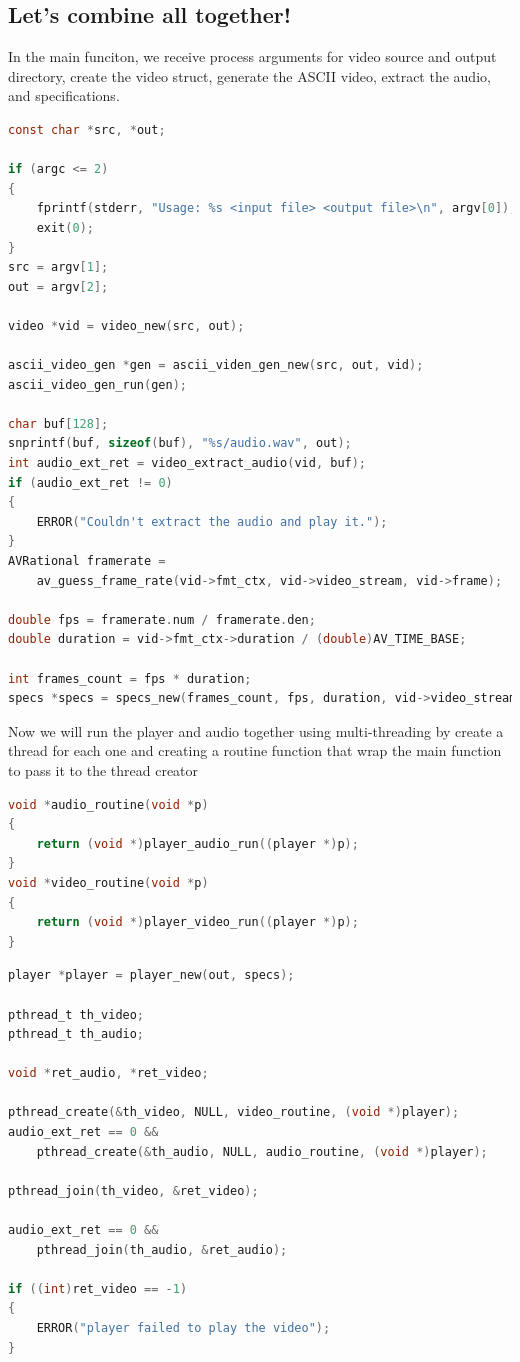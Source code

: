 \documentclass[a4paper,12pt]{article}
\begin{document}
\subsection{Let's combine all together!}
In the main funciton, we receive process arguments for video source and output directory, create the video struct, generate the ASCII video, extract the audio, and specifications.

\begin{lstlisting}[language=c]
 const char *src, *out;

if (argc <= 2)
{
    fprintf(stderr, "Usage: %s <input file> <output file>\n", argv[0]);
    exit(0);
}
src = argv[1];
out = argv[2];

video *vid = video_new(src, out);

ascii_video_gen *gen = ascii_viden_gen_new(src, out, vid);
ascii_video_gen_run(gen);

char buf[128];
snprintf(buf, sizeof(buf), "%s/audio.wav", out);
int audio_ext_ret = video_extract_audio(vid, buf);
if (audio_ext_ret != 0)
{
    ERROR("Couldn't extract the audio and play it.");
}
AVRational framerate =
    av_guess_frame_rate(vid->fmt_ctx, vid->video_stream, vid->frame);

double fps = framerate.num / framerate.den;
double duration = vid->fmt_ctx->duration / (double)AV_TIME_BASE;

int frames_count = fps * duration;
specs *specs = specs_new(frames_count, fps, duration, vid->video_stream->codecpar->width, vid->video_stream->codecpar->height, audio_ext_ret == 0 ? true : false);
\end{lstlisting}

\newpage


Now we will run the player and audio together using multi-threading by create a thread for each one and creating a routine function that wrap the main function to pass it to the thread creator

\begin{lstlisting}[language=c]
void *audio_routine(void *p)
{
    return (void *)player_audio_run((player *)p);
}
void *video_routine(void *p)
{
    return (void *)player_video_run((player *)p);
}    
\end{lstlisting}

\begin{lstlisting}[language=c]
player *player = player_new(out, specs);

pthread_t th_video;
pthread_t th_audio;

void *ret_audio, *ret_video;

pthread_create(&th_video, NULL, video_routine, (void *)player);
audio_ext_ret == 0 &&
    pthread_create(&th_audio, NULL, audio_routine, (void *)player);

pthread_join(th_video, &ret_video);

audio_ext_ret == 0 &&
    pthread_join(th_audio, &ret_audio);

if ((int)ret_video == -1)
{
    ERROR("player failed to play the video");
} 
\end{lstlisting}
\end{document}
